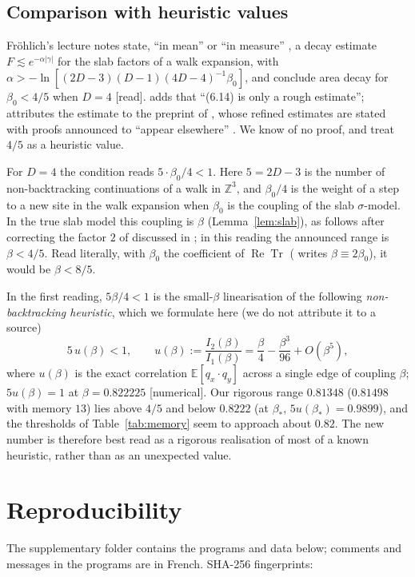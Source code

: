 \documentclass[11pt,a4paper]{article}
\theoremstyle{plain}
\theoremstyle{remark}
\numberwithin{equation}{section}
\newcommand{\Z}{\mathbb{Z}}
\newcommand{\E}{\mathbb{E}}
\newcommand{\ReTr}{\operatorname{Re}\operatorname{Tr}}
\newcommand{\st}[1]{\textsf{[#1]}}
\begin{document}
\subsection{Comparison with heuristic values}\label{sec:heur}
Fr\"ohlich's lecture notes state, ``in mean'' \cite[p.~24, (6.14)--(6.16)]{Fro80a} or ``in measure'' \cite[p.~20,
(34)--(35)]{Fro80b}, a decay estimate $F\lesssim e^{-\alpha|\gamma|}$ for the slab factors of a walk expansion, with
$\alpha>-\ln[(2D-3)(D-1)(4D-4)^{-1}\beta_0]$, and conclude area decay for $\beta_0<4/5$ when $D=4$ \st{read}. \cite[p.~24]{Fro80a}
adds that ``(6.14) is only a rough estimate''; \cite[p.~20]{Fro80b} attributes the estimate to the preprint of \cite{DF80}, whose refined
estimates are stated with proofs announced to ``appear elsewhere'' \cite[preprint pp.~55, 57]{DF80}. We know of no proof, and treat
$4/5$ as a heuristic value.

For $D=4$ the condition reads $5\cdot\beta_0/4<1$. Here $5=2D-3$ is the number of non-backtracking continuations of a walk in
$\Z^3$, and $\beta_0/4$ is the weight of a step to a new site in the walk expansion when $\beta_0$ is the coupling of the slab
$\sigma$-model. In the true slab model this coupling is $\beta$ (Lemma~\ref{lem:slab}), as follows after correcting the factor $2$ of
\cite{DF80} discussed in \cite[\S7.2]{D7}; in this reading the announced range is $\beta<4/5$. Read literally, with $\beta_0$ the
coefficient of $\ReTr$ (\cite[p.~22]{Fro80b} writes $\beta\equiv2\beta_0$), it would be $\beta<8/5$.

In the first reading, $5\beta/4<1$ is the small-$\beta$ linearisation of the following \emph{non-backtracking heuristic}, which we
formulate here (we do not attribute it to a source)
\[
5\,u(\beta)<1,\qquad u(\beta):=\frac{I_2(\beta)}{I_1(\beta)}=\frac\beta4-\frac{\beta^3}{96}+O(\beta^5),
\]
where $u(\beta)$ is the exact correlation $\E[q_x\cdot q_y]$ across a single edge of coupling $\beta$; $5u(\beta)=1$ at
$\beta=0.822225$ \st{numerical}. Our rigorous range $0.81348$ ($0.81498$ with memory $13$) lies above $4/5$ and below $0.8222$
(at $\beta_*$, $5u(\beta_*)=0.9899$), and the thresholds of Table~\ref{tab:memory} seem to approach about $0.82$. The new number is
therefore best read as a rigorous realisation of most of a known heuristic, rather than as an unexpected value.

\section{Reproducibility}\label{sec:repro}
The supplementary folder contains the programs and data below; comments and messages in the programs are in French. SHA-256
fingerprints:
\end{document}
